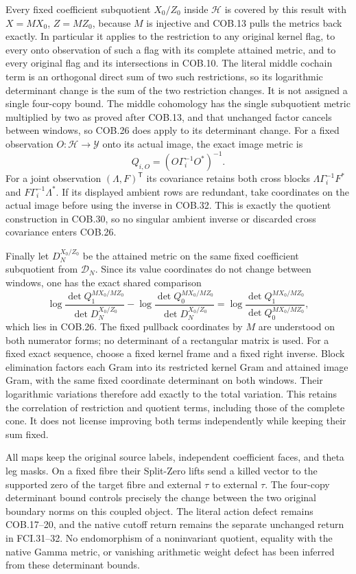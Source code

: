 Every fixed coefficient subquotient $X_0/Z_0$ inside $\mathcal H$
is covered by this result with $X=MX_0$, $Z=MZ_0$, because $M$ is
injective and COB.13 pulls the metrics back exactly.  In particular
it applies to the restriction to any original kernel flag, to every
onto observation of such a flag with its complete attained metric,
and to every original flag and its intersections in COB.10.  The
literal middle cochain term is an orthogonal direct sum of two such
restrictions, so its logarithmic determinant change is the sum of
the two restriction changes.  It is not assigned a single four-copy
bound.  The middle cohomology has the single subquotient metric
multiplied by two as proved after COB.13, and that unchanged factor
cancels between windows, so COB.26 does apply to its determinant
change.  For a fixed
observation $O:\mathcal H\to\mathcal Y$ onto its actual image,
the exact image metric is
\[
 Q_{i,O}=(O\Gamma_i^{-1}O^*)^{-1}.
 \tag{COB.32}
\]
For a joint observation $(\Lambda,F)^{\mathsf T}$ its covariance
retains both cross blocks
$\Lambda\Gamma_i^{-1}F^*$ and $F\Gamma_i^{-1}\Lambda^*$.
If its displayed ambient rows are redundant, take coordinates on
the actual image before using the inverse in COB.32.  This is
exactly the quotient construction in COB.30, so no singular ambient
inverse or discarded cross covariance enters COB.26.

Finally let $D_N^{X_0/Z_0}$ be the attained metric on the same fixed
coefficient subquotient from $\mathcal D_N$.  Since its value
coordinates do not change between windows, one has the exact
shared comparison
\[
 \log\frac{\det Q_1^{MX_0/MZ_0}}{\det D_N^{X_0/Z_0}}
 -\log\frac{\det Q_0^{MX_0/MZ_0}}{\det D_N^{X_0/Z_0}}
 =\log\frac{\det Q_1^{MX_0/MZ_0}}{\det Q_0^{MX_0/MZ_0}},
 \tag{COB.33}
\]
which lies in COB.26.  The fixed pullback coordinates by $M$ are
understood on both numerator forms; no determinant of a rectangular
matrix is used.  For a fixed exact sequence, choose a fixed kernel
frame and a fixed right inverse.  Block elimination factors each
Gram into its restricted kernel Gram and attained image Gram, with
the same fixed coordinate determinant on both windows.  Their
logarithmic variations therefore add exactly to the total variation.
This retains the correlation of restriction and quotient terms,
including those of the complete cone.  It does not license improving
both terms independently while keeping their sum fixed.

All maps keep the original source labels, independent coefficient
faces, and theta leg masks.  On a fixed fibre their Split-Zero lifts
send a killed vector to the supported zero of the target fibre and
external $\tau$ to external $\tau$.  The four-copy determinant
bound controls precisely the change between the two original
boundary norms on this coupled object.  The literal action defect
remains COB.17--20, and the native cutoff return remains the
separate unchanged return in FCI.31--32.  No endomorphism of a
noninvariant quotient, equality with the native Gamma metric, or
vanishing arithmetic weight defect has been inferred from these
determinant bounds.
